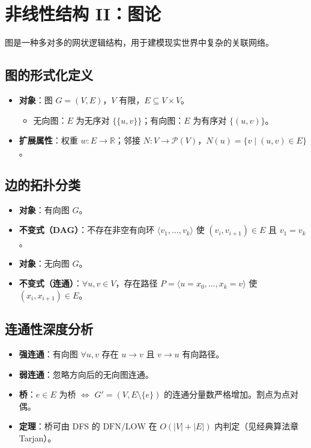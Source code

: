\clearpage
\begingroup
\let\clearpage\relax
\let\cleardoublepage\relax
\vspace*{\fill}
\chapter{非线性结构 II：图论}
\begin{center}
图是一种多对多的网状逻辑结构，用于建模现实世界中复杂的关联网络。
\end{center}
\vspace*{\fill}
\endgroup
\clearpage


\section{图的形式化定义}

\begin{itemize}
    \item \textbf{对象}：图 $G=(V,E)$，$V$ 有限，$E\subseteq V\times V$。
    \begin{itemize}
        \item 无向图：$E$ 为无序对 $\{\{u,v\}\}$；有向图：$E$ 为有序对 $\{(u,v)\}$。
    \end{itemize}
    \item \textbf{扩展属性}：权重 $w:E\to\mathbb{R}$；邻接 $N: V\to\mathcal{P}(V)$，$N(u)=\{v\mid(u,v)\in E\}$。
\end{itemize}

\section{边的拓扑分类}

\begin{itemize}
    \item \textbf{对象}：有向图 $G$。
    \item \textbf{不变式（DAG）}：不存在非空有向环 $\langle v_1,\dots,v_k\rangle$ 使 $(v_i,v_{i+1})\in E$ 且 $v_1=v_k$。
    \item \textbf{对象}：无向图 $G$。
    \item \textbf{不变式（连通）}：$\forall u,v\in V$，存在路径 $P=\langle u=x_0,\dots,x_k=v\rangle$ 使 $(x_i,x_{i+1})\in E$。
\end{itemize}

\section{连通性深度分析}

\begin{itemize}
    \item \textbf{强连通}：有向图 $\forall u,v$ 存在 $u\to v$ 且 $v\to u$ 有向路径。
    \item \textbf{弱连通}：忽略方向后的无向图连通。
    \item \textbf{桥}：$e\in E$ 为桥 $\iff$ $G'=(V,E\setminus\{e\})$ 的连通分量数严格增加。割点为点对偶。
    \item \textbf{定理}：桥可由 DFS 的 $\text{DFN}/\text{LOW}$ 在 $O(|V|+|E|)$ 内判定（见经典算法章 Tarjan）。
\end{itemize}

